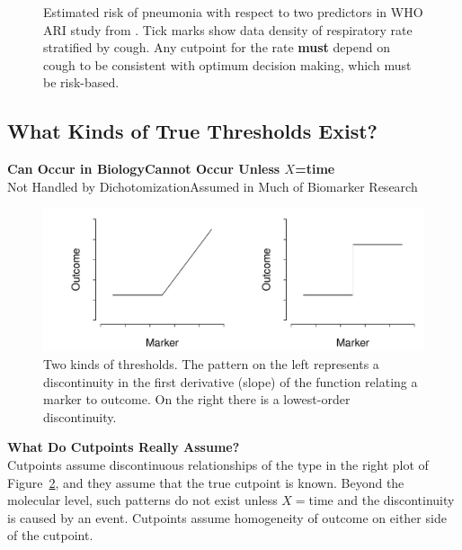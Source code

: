 \begin{Schunk}
\begin{figure}[htbp]
\caption[Risk of pneumonia with two predictors]{Estimated risk of pneumonia with respect to two predictors in WHO ARI study from \citet{har98dev}.  Tick marks show data density of respiratory rate stratified by cough.  Any cutpoint for the rate \textbf{must} depend on cough to be consistent with optimum decision making, which must be risk-based.}\label{fig:info-pneuwho}
\end{figure}
\end{Schunk}
\clearpage
\subsection{What Kinds of True Thresholds Exist?}

\vspace{0.3in}

\textbf{Can Occur in Biology}\hfill \textbf{Cannot Occur \smaller Unless $X$=time}\\
{\smaller[2] Not Handled by Dichotomization}\hfill {\smaller[2] Assumed in Much of Biomarker Research}
\begin{Schunk}
\begin{figure}[htbp]

\centerline{\includegraphics[width=\maxwidth]{info-thresholds-1} }

\caption[Two kinds of thresholds]{Two kinds of thresholds.  The pattern on the left represents a discontinuity in the first derivative (slope) of the function relating a marker to outcome.  On the right there is a lowest-order discontinuity.}\label{fig:info-thresholds}
\end{figure}
\end{Schunk}

\textbf{What Do Cutpoints Really Assume?}\\
Cutpoints assume discontinuous relationships of the type in the right
plot of Figure~\ref{fig:info-thresholds}, and they assume that the
true cutpoint is known.  Beyond the molecular level, such patterns do
not exist unless $X=$time and the discontinuity is caused by an event.
Cutpoints assume homogeneity of outcome on either side of the cutpoint.

